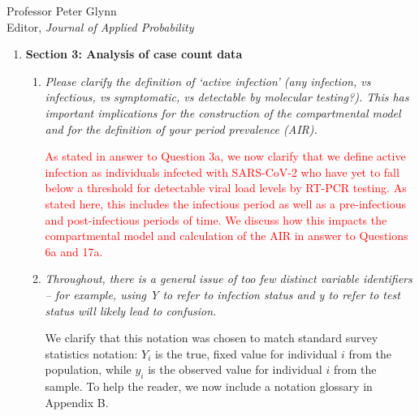 \documentclass[11pt]{letter} %
\begin{document}
\begin{letter}{Professor
	Peter Glynn\\
	Editor, {\em Journal of Applied Probability}}
\begin{enumerate}
\begin{enumerate}
	The difference in age breakdown of sampled individuals in the Facebook / CMU survey, now referred to as Delphi's COVID-19 Trends and Impact Survey (CTIS), from the general population is acknowledged in Section 5.  Table 1 now presents estimates of all demographic and covariate information using Delphi CTIS's weighting procedure.  These weights are used in computing probabilities of selection as shown in Equation (4.2) in Section 4.1.1. Estimates for 'Fever' and 'Household + Case' only use data collected between April 25th and 29th to match the timing of the random survey.  Note that individual-level racial demographics were not provided by CTIS due to data privacy concerns and there was no corresponding question on percent of tests from individuals with a prior positive test.

	\vspace{5mm}
\end{enumerate}
\item {\bf Section 3: Analysis of case count data}
\begin{enumerate}
	\item {\it Please clarify the definition of ‘active infection’ (any infection, vs infectious, vs symptomatic, vs detectable by molecular testing?). This has important implications for the construction of the compartmental model and for the definition of your period prevalence (AIR).}
	\vspace{5mm}

	\textcolor{red}{As stated in answer to Question 3a, we now clarify that we define active infection as individuals infected with SARS-CoV-2 who have yet to fall below a threshold for detectable viral load levels by RT-PCR testing. As stated here, this includes the infectious period as well as a pre-infectious and post-infectious periods of time.  We discuss how this impacts the compartmental model and calculation of the AIR in answer to Questions 6a and 17a.}
	\vspace{5mm}
	\item {\it Throughout, there is a general issue of too few distinct variable identifiers – for example, using Y to refer to infection status and y to refer to test status will likely lead to confusion.}
	\vspace{5mm}

	We clarify that this notation was chosen to match standard survey statistics notation: $Y_i$ is the true, fixed value for individual $i$ from the population, while $y_i$ is the observed value for individual $i$ from the sample. To help the reader, we now include a notation glossary in Appendix B.
	\vspace{5mm}


\end{enumerate}
\end{enumerate}
\end{letter}
\end{document}
